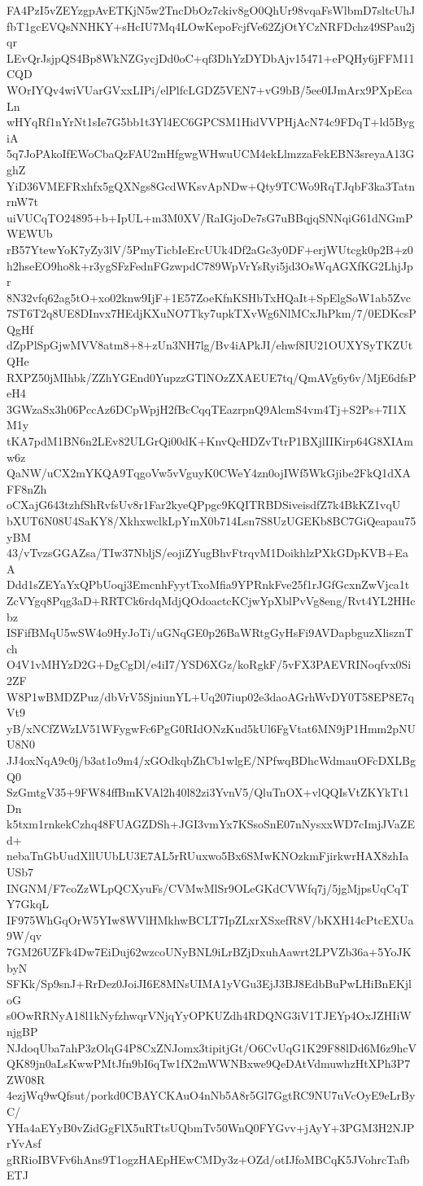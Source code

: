 FA4PzI5vZEYzgpAvETKjN5w2TncDbOz7ckiv8gO0QhUr98vqaFsWlbmD7sltcUhJ
fbT1gcEVQsNNHKY+sHcIU7Mq4LOwKepoFcjfVe62ZjOtYCzNRFDchz49SPau2jqr
LEvQrJsjpQS4Bp8WkNZGycjDd0oC+qf3DhYzDYDbAjv15471+ePQHy6jFFM11CQD
WOrIYQv4wiVUarGVxxLIPi/elPlfcLGDZ5VEN7+vG9bB/5ee0IJmArx9PXpEcaLn
wHYqRf1nYrNt1sIe7G5bb1t3Yl4EC6GPCSM1HidVVPHjAcN74c9FDqT+ld5BygiA
5q7JoPAkoIfEWoCbaQzFAU2mHfgwgWHwuUCM4ekLlmzzaFekEBN3sreyaA13GghZ
YiD36VMEFRxhfx5gQXNgs8GcdWKsvApNDw+Qty9TCWo9RqTJqbF3ka3TatnrnW7t
uiVUCqTO24895+b+IpUL+m3M0XV/RaIGjoDe7sG7uBBqjqSNNqiG61dNGmPWEWUb
rB57YtewYoK7yZy3lV/5PmyTicbIeErcUUk4Df2aGc3y0DF+erjWUtcgk0p2B+z0
h2hseEO9ho8k+r3ygSFzFednFGzwpdC789WpVrYsRyi5jd3OsWqAGXfKG2LhjJpr
8N32vfq62ag5tO+xo02knw9IjF+1E57ZoeKfnKSHbTxHQaIt+SpElgSoW1ab5Zvc
7ST6T2q8UE8DInvx7HEdjKXuNO7Tky7upkTXvWg6NlMCxJhPkm/7/0EDKcsPQgHf
dZpPlSpGjwMVV8atm8+8+zUn3NH7lg/Bv4iAPkJI/ehwf8IU21OUXYSyTKZUtQHe
RXPZ50jMIhbk/ZZhYGEnd0YupzzGTlNOzZXAEUE7tq/QmAVg6y6v/MjE6dfsPeH4
3GWzaSx3h06PccAz6DCpWpjH2fBcCqqTEazrpnQ9AlcmS4vm4Tj+S2Ps+7I1XM1y
tKA7pdM1BN6n2LEv82ULGrQi00dK+KnvQcHDZvTtrP1BXjlIIKirp64G8XIAmw6z
QaNW/uCX2mYKQA9TqgoVw5vVguyK0CWeY4zn0ojIWf5WkGjibe2FkQ1dXAFF8nZh
oCXajG643tzhfShRvfsUv8r1Far2kyeQPpgc9KQITRBDSiveisdfZ7k4BkKZ1vqU
bXUT6N08U4SaKY8/XkhxwclkLpYmX0b714Lsn7S8UzUGEKb8BC7GiQeapau75yBM
43/vTvzsGGAZsa/TIw37NbljS/eojiZYugBhvFtrqvM1DoikhlzPXkGDpKVB+EaA
Ddd1sZEYaYxQPbUoqj3EmcnhFyytTxoMfia9YPRnkFve25f1rJGfGcxnZwVjca1t
ZcVYgq8Pqg3aD+RRTCk6rdqMdjQOdoactcKCjwYpXblPvVg8eng/Rvt4YL2HHcbz
ISFifBMqU5wSW4o9HyJoTi/uGNqGE0p26BaWRtgGyHsFi9AVDapbguzXlisznTch
O4V1vMHYzD2G+DgCgDl/e4iI7/YSD6XGz/koRgkF/5vFX3PAEVRINoqfvx0Si2ZF
W8P1wBMDZPuz/dbVrV5SjniunYL+Uq207iup02e3daoAGrhWvDY0T58EP8E7qVt9
yB/xNCfZWzLV51WFygwFc6PgG0RIdONzKud5kUl6FgVtat6MN9jP1Hmm2pNUU8N0
JJ4oxNqA9c0j/b3at1o9m4/xGOdkqbZhCb1wlgE/NPfwqBDhcWdmauOFcDXLBgQ0
SzGmtgV35+9FW84ffBmKVAl2h40l82zi3YvnV5/QluTnOX+vlQQIsVtZKYkTt1Dn
k5txm1rnkekCzhq48FUAGZDSh+JGI3vmYx7KSsoSnE07nNysxxWD7cImjJVaZEd+
nebaTnGbUudXllUUbLU3E7AL5rRUuxwo5Bx6SMwKNOzkmFjirkwrHAX8zhIaUSb7
INGNM/F7coZzWLpQCXyuFs/CVMwMlSr9OLeGKdCVWfq7j/5jgMjpsUqCqTY7GkqL
IF975WhGqOrW5YIw8WVlHMkhwBCLT7IpZLxrXSxefR8V/bKXH14cPtcEXUa9W/qv
7GM26UZFk4Dw7EiDuj62wzcoUNyBNL9iLrBZjDxuhAawrt2LPVZb36a+5YoJKbyN
SFKk/Sp9snJ+RrDez0JoiJI6E8MNsUIMA1yVGu3EjJ3BJ8EdbBuPwLHiBnEKjloG
s0OwRRNyA18l1kNyfzhwqrVNjqYyOPKUZdh4RDQNG3iV1TJEYp4OxJZHIiWnjgBP
NJdoqUba7ahP3zOlqG4P8CxZNJomx3tipitjGt/O6CvUqG1K29F88lDd6M6z9hcV
QK89jn0aLsKwwPMtJfn9bI6qTw1fX2mWWNBxwe9QeDAtVdmuwhzHtXPh3P7ZW08R
4ezjWq9wQfsut/porkd0CBAYCKAuO4nNb5A8r5Gl7GgtRC9NU7uVcOyE9eLrByC/
YHa4aEYyB0vZidGgFlX5uRTtsUQbmTv50WnQ0FYGvv+jAyY+3PGM3H2NJPrYvAsf
gRRioIBVFv6hAns9T1ogzHAEpHEwCMDy3z+OZd/otIJfoMBCqK5JVohrcTafbETJ
